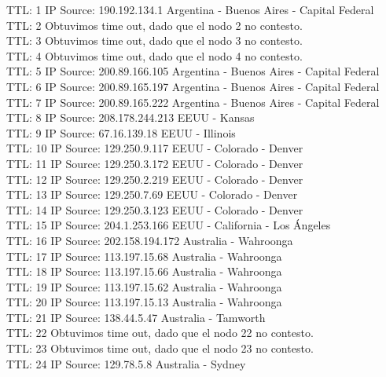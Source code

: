 TTL:  1    IP Source: 190.192.134.1    Argentina - Buenos Aires - Capital Federal\\ 
TTL:  2    Obtuvimos time out, dado que el nodo 2 no contesto. \\
TTL:  3    Obtuvimos time out, dado que el nodo 3 no contesto. \\
TTL:  4    Obtuvimos time out, dado que el nodo 4 no contesto. \\
TTL:  5    IP Source: 200.89.166.105   Argentina - Buenos Aires - Capital Federal\\  
TTL:  6    IP Source: 200.89.165.197   Argentina - Buenos Aires - Capital Federal\\ 
TTL:  7    IP Source: 200.89.165.222   Argentina - Buenos Aires - Capital Federal\\ 
TTL:  8    IP Source: 208.178.244.213  EEUU - Kansas\\ 
TTL:  9    IP Source: 67.16.139.18     EEUU - Illinois\\ 
TTL: 10    IP Source: 129.250.9.117    EEUU - Colorado - Denver\\ 
TTL: 11    IP Source: 129.250.3.172    EEUU - Colorado - Denver\\  
TTL: 12    IP Source: 129.250.2.219    EEUU - Colorado - Denver\\ 
TTL: 13    IP Source: 129.250.7.69     EEUU - Colorado - Denver\\ 
TTL: 14    IP Source: 129.250.3.123    EEUU - Colorado - Denver\\  
TTL: 15    IP Source: 204.1.253.166    EEUU - California - Los \'Angeles\\
TTL: 16    IP Source: 202.158.194.172  Australia - Wahroonga\\ 
TTL: 17    IP Source: 113.197.15.68    Australia - Wahroonga\\ 
TTL: 18    IP Source: 113.197.15.66    Australia - Wahroonga\\  
TTL: 19    IP Source: 113.197.15.62    Australia - Wahroonga\\  
TTL: 20    IP Source: 113.197.15.13    Australia - Wahroonga\\  
TTL: 21    IP Source: 138.44.5.47      Australia - Tamworth\\ 
TTL: 22    Obtuvimos time out, dado que el nodo 22 no contesto. \\ 
TTL: 23    Obtuvimos time out, dado que el nodo 23 no contesto. \\
TTL: 24    IP Source: 129.78.5.8       Australia - Sydney\newline


